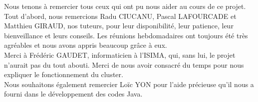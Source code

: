 
Nous tenons à remercier tous ceux qui ont pu nous aider au cours de ce projet.\\
Tout d'abord, nous remercions Radu CIUCANU, Pascal LAFOURCADE et Matthieu GIRAUD, nos tuteurs, pour leur disponibilité, leur patience, leur bienveillance et leurs conseils. Les réunions hebdomadaires ont toujours été très agréables et nous avons appris beaucoup grâce à eux.\\
Merci à Frédéric GAUDET, informaticien à l'ISIMA, qui, sans lui, le projet n'aurait pas du tout abouti. Merci de nous avoir consacré du temps pour nous expliquer le fonctionnement du cluster.\\
Nous souhaitons également remercier Loïc YON pour l'aide précieuse qu'il nous a fourni dans le développement des codes Java.
